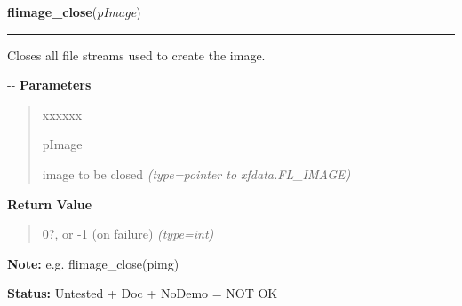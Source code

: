     \label{xformslib:flflimage:flimage_close}

    \vspace{0.5ex}

\hspace{.8\funcindent}\begin{boxedminipage}{\funcwidth}

    \raggedright \textbf{flimage\_close}(\textit{pImage})

    \vspace{-1.5ex}

    \rule{\textwidth}{0.5\fboxrule}
\setlength{\parskip}{2ex}

Closes all file streams used to create the image.

-{}-
\setlength{\parskip}{1ex}
      \textbf{Parameters}
      \vspace{-1ex}

      \begin{quote}
        \begin{Ventry}{xxxxxx}

          \item[pImage]


image to be closed
            {\it (type=pointer to xfdata.FL\_IMAGE)}

        \end{Ventry}

      \end{quote}

      \textbf{Return Value}
    \vspace{-1ex}

      \begin{quote}

0?, or -1 (on failure)
      {\it (type=int)}

      \end{quote}

\textbf{Note:} 
e.g. flimage\_close(pimg)


\textbf{Status:} 
Untested + Doc + NoDemo = NOT OK


    \end{boxedminipage}

    \label{xformslib:flflimage:flimage_alloc}

    \vspace{0.5ex}

